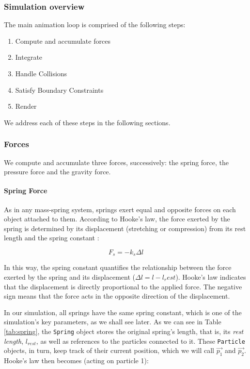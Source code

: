 \documentclass[manuscript, screen]{timtm}
\begin{document}
\subsubsection{Simulation overview}

The main animation loop is comprised of the following steps:

\begin{enumerate}
    \item Compute and accumulate forces
    \item Integrate
    \item Handle Collisions
    \item Satisfy Boundary Constraints
    \item Render
\end{enumerate}

We address each of these steps in the following sections.

\subsubsection{Forces}\label{section:forces}

We compute and accumulate three forces, successively: the spring force, the pressure force and the gravity force.

\paragraph{Spring Force}

As in any mass-spring system, springs exert equal and opposite forces on each object attached to them. According to Hooke’s law, the force exerted by the spring is determined by its displacement (stretching or compression) from its rest length and the spring constant \cite{physics-game-developers-oreilly}:

\[F_s = -k_s \Delta l\]

In this way, the spring constant quantifies the relationship between the force exerted by the spring and its displacement ($\Delta l = l - l_rest$). Hooke’s law indicates that the displacement is directly proportional to the applied force. The negative sign means that the force acts in the opposite direction of the displacement. 

In our simulation, all springs have the same spring constant, which is one of the simulation's key parameters, as we shall see later. As we can see in Table \ref{tab:spring}, the \texttt{Spring} object stores the original spring's length, that is, its \textit{rest length}, $l_{rest}$, as well as references to the particles connected to it. These \texttt{Particle} objects, in turn, keep track of their current position, which we will call $\vec{p_1}$ and $\vec{p_2}$. Hooke's law then becomes (acting on particle 1):
\end{document}
